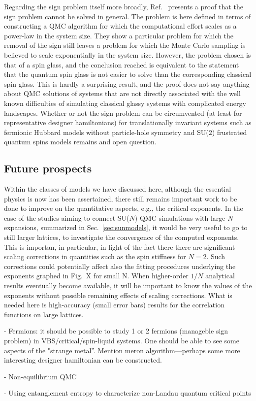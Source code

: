 \documentclass[range]{ar2e}
\begin{document}
Regarding the sign problem itself more broadly, Ref.~\cite{Troyer05} presents a proof that the sign problem cannot be solved in general. 
The problem is here defined in terms of constructing a QMC algorithm for which the computational effort scales as a power-law in the system
size. They show a particular problem for which the removal of the sign still leaves a problem for which the Monte Carlo sampling is believed 
to scale exponentially in the system size. However, the problem chosen is that of a spin glass, and the conclusion reached is equivalent to
the statement that the quantum spin glass is not easier to solve than the corresponding classical spin glass. This is hardly a surprising result, 
and the proof does not say anything about QMC solutions of systems that are not directly associated with the well known difficulties of simulating 
classical glassy systems with complicated energy landscapes. Whether or not the sign problem can be circumvented (at least for representative 
designer hamiltonians) for translationally invariant systems such as fermionic Hubbard models without particle-hole symmetry and SU($2$) frustrated 
quantum spins models remains and open question.

\subsection{Future prospects}

Within the classes of models we have discussed here, although the essential physics is now has been assertained, there still remains
important work to be done to improve on the quantitative aspects, e.g., the critical exponents. In the case of the studies aiming to connect
SU($N$) QMC simulations with large-$N$ expansions, summarized in Sec.~\ref{sec:sunmodels}, it would be very useful to go to still larger lattices, 
to investigate the convergence of the computed exponents. This is importan, in particular, in light of the fact there there are significant scaling 
corrections in quantities such as the spin stiffness for $N=2$. Such corrections could potentially affect also the fitting procedures underlying 
the exponents graphed in Fig.~X for small N. When higher-order $1/N$ analytical results eventually become available, it will be important to know 
the values of the exponents without possible remaining effects of scaling corrections. What is needed here is high-accuracy (small error bars) 
results for the correlation functions on large lattices.

- Fermions: it should be possible to study 1 or 2 fermions (manageble sign problem) in 
VBS/critical/spin-liquid systems. One should be able to see some aspects of the "strange metal''.
Mention meron algorithm---perhaps some more interesting designer hamiltonian can be constructed.

- Non-equilibrium QMC

- Using entanglement entropy to characterize non-Landau quantum critical points




\end{document}
